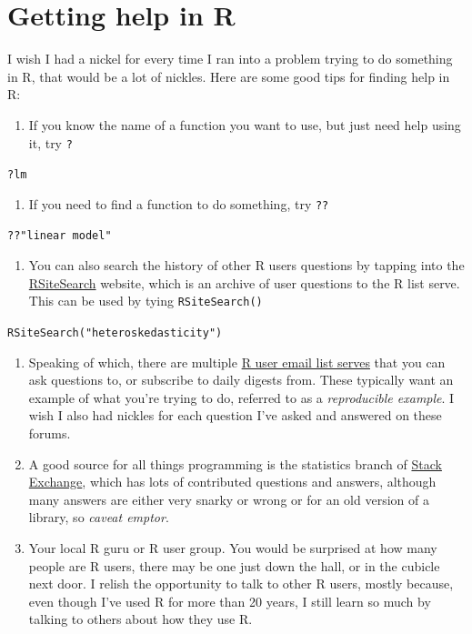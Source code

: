 \documentclass[
  letterpaper,
  DIV=11,
  numbers=noendperiod]{scrreprt}
\providecommand{\tightlist}{%
  \setlength{\itemsep}{0pt}\setlength{\parskip}{0pt}}\usepackage{longtable,booktabs,array}
\begin{document}
\hypertarget{getting-help-in-r}{%
\section{Getting help in R}\label{getting-help-in-r}}

I wish I had a nickel for every time I ran into a problem trying to do
something in R, that would be a lot of nickles. Here are some good tips
for finding help in R:

\begin{enumerate}
\def\labelenumi{\arabic{enumi})}
\tightlist
\item
  If you know the name of a function you want to use, but just need help
  using it, try \texttt{?}
\end{enumerate}

\texttt{?lm}

\begin{enumerate}
\def\labelenumi{\arabic{enumi})}
\setcounter{enumi}{1}
\tightlist
\item
  If you need to find a function to do something, try \texttt{??}
\end{enumerate}

\texttt{??"linear\ model"}

\begin{enumerate}
\def\labelenumi{\arabic{enumi})}
\setcounter{enumi}{2}
\tightlist
\item
  You can also search the history of other R users questions by tapping
  into the \href{http://finzi.psych.upenn.edu/search.html}{RSiteSearch}
  website, which is an archive of user questions to the R list serve.
  This can be used by tying \texttt{RSiteSearch()}
\end{enumerate}

\texttt{RSiteSearch("heteroskedasticity")}

\begin{enumerate}
\def\labelenumi{\arabic{enumi})}
\setcounter{enumi}{3}
\item
  Speaking of which, there are multiple
  \href{https://www.r-project.org/mail.html}{R user email list serves}
  that you can ask questions to, or subscribe to daily digests from.
  These typically want an example of what you're trying to do, referred
  to as a \emph{reproducible example}. I wish I also had nickles for
  each question I've asked and answered on these forums.
\item
  A good source for all things programming is the statistics branch of
  \href{https://stats.stackexchange.com}{Stack Exchange}, which has lots
  of contributed questions and answers, although many answers are either
  very snarky or wrong or for an old version of a library, so
  \emph{caveat emptor}.
\item
  Your local R guru or R user group. You would be surprised at how many
  people are R users, there may be one just down the hall, or in the
  cubicle next door. I relish the opportunity to talk to other R users,
  mostly because, even though I've used R for more than 20 years, I
  still learn so much by talking to others about how they use R.
\end{enumerate}
\end{document}
